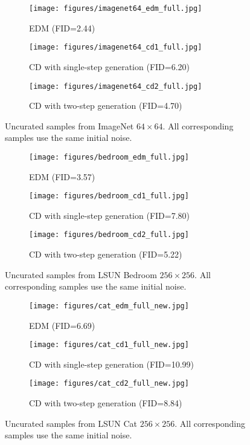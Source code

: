 \begin{appendices}
\begin{figure}
    \centering
    \begin{subfigure}[b]{\textwidth}
        \texttt{[image: figures/imagenet64\_edm\_full.jpg]}
        \caption{EDM (FID=2.44)}
    \end{subfigure}
    \begin{subfigure}[b]{\textwidth}
        \texttt{[image: figures/imagenet64\_cd1\_full.jpg]}
        \caption{CD with single-step generation (FID=6.20)}
    \end{subfigure}
    \begin{subfigure}[b]{\textwidth}
        \texttt{[image: figures/imagenet64\_cd2\_full.jpg]}
        \caption{CD with two-step generation (FID=4.70)}
    \end{subfigure}
    \caption{Uncurated samples from ImageNet $64\times 64$. All corresponding samples use the same initial noise.}
    \label{fig:imagenet64_full_cd}
\end{figure}


\begin{figure}
    \centering
    \begin{subfigure}[b]{\textwidth}
        \texttt{[image: figures/bedroom\_edm\_full.jpg]}
        \caption{EDM (FID=3.57)}
    \end{subfigure}
    \begin{subfigure}[b]{\textwidth}
        \texttt{[image: figures/bedroom\_cd1\_full.jpg]}
        \caption{CD with single-step generation (FID=7.80)}
    \end{subfigure}
    \begin{subfigure}[b]{\textwidth}
        \texttt{[image: figures/bedroom\_cd2\_full.jpg]}
        \caption{CD with two-step generation (FID=5.22)}
    \end{subfigure}
    \caption{Uncurated samples from LSUN Bedroom $256\times 256$. All corresponding samples use the same initial noise.}
    \label{fig:bedroom_full_cd}
\end{figure}

\begin{figure}
    \centering
    \begin{subfigure}[b]{\textwidth}
        \texttt{[image: figures/cat\_edm\_full\_new.jpg]}
        \caption{EDM (FID=6.69)}
    \end{subfigure}
    \begin{subfigure}[b]{\textwidth}
        \texttt{[image: figures/cat\_cd1\_full\_new.jpg]}
        \caption{CD with single-step generation (FID=10.99)}
    \end{subfigure}
    \begin{subfigure}[b]{\textwidth}
        \texttt{[image: figures/cat\_cd2\_full\_new.jpg]}
        \caption{CD with two-step generation (FID=8.84)}
    \end{subfigure}
    \caption{Uncurated samples from LSUN Cat $256\times 256$. All corresponding samples use the same initial noise.}
    \label{fig:cat_full_cd}
\end{figure}




\end{appendices}
